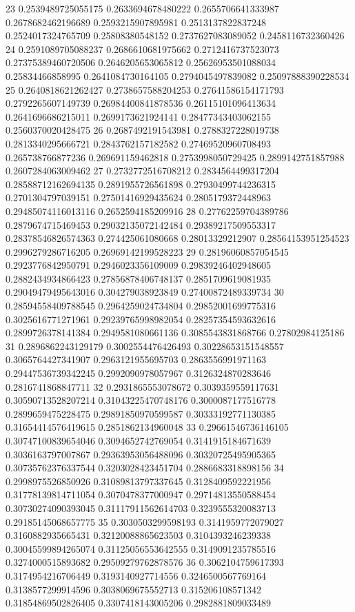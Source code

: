 23 0.2539489725055175 0.2633694678480222 0.2655706641333987 0.2678682462196689 0.2593215907895981 0.2513137822837248 0.2524017324765709 0.25808380548152 0.2737627083089052 0.2458116732360426
24 0.2591089705088237 0.2686610681975662 0.2712416737523073 0.27375389460720506 0.2646205653065812 0.25626953501088034 0.25834466858995 0.2641084730164105 0.2794045497839082 0.25097888390228534
25 0.2640818621262427 0.2738657588204253 0.27641586154171793 0.2792265607149739 0.26984400841878536 0.26115101096413634 0.2641696686215011 0.2699173621924141 0.28477343403062155 0.2560370020428475
26 0.2687492191543981 0.2788327228019738 0.2813340295666721 0.2843762157182582 0.27469520960708493 0.265738766877236 0.269691159462818 0.2753998050729425 0.2899142751857988 0.2607284063009462
27 0.2732772516708212 0.2834564499317204 0.28588712162694135 0.2891955726561898 0.27930499744236315 0.2701304797039151 0.27501416929435624 0.2805179372448963 0.29485074116013116 0.2652594185209916
28 0.27762259704389786 0.2879674715469453 0.29032135072142484 0.29389217509553317 0.28378546826574363 0.274425061080668 0.28013329212907 0.28564153951254523 0.2996279286716205 0.26969142199528223
29 0.28196060857054545 0.2923776842950791 0.2946023356109009 0.29839246402948605 0.2882434934866423 0.27856878406748137 0.2851709619081935 0.29049479495643016 0.304279038923849 0.27400872489339734
30 0.28594558409788545 0.2964259024734804 0.29852001699775316 0.3025616771271961 0.29239765998982054 0.28257354593632616 0.2899726378141384 0.2949581080661136 0.3085543831868766 0.27802984125186
31 0.2896862243129179 0.3002554476426493 0.30228653151548557 0.3065764427341907 0.2963121955695703 0.2863556991971163 0.29447536739342245 0.2992090978057967 0.3126324870283646 0.2816741868847711
32 0.2931865553078672 0.3039359559117631 0.30590713528207214 0.31043225470748176 0.3000087177516778 0.2899659475228475 0.29891850970599587 0.30333192771130385 0.31654414576419615 0.2851862134960048
33 0.29661546736146105 0.30747100839654046 0.3094652742769054 0.3141915184671639 0.3036163797007867 0.29363953056488096 0.30320725495905365 0.30735762376337544 0.3203028423451704 0.2886683318898156
34 0.2998975526850926 0.31089813797337645 0.3128409592221956 0.31778139814711054 0.3070478377000947 0.29714813550588454 0.30730274090393045 0.31117911562614703 0.3239555320083713 0.29185145068657775
35 0.3030503299598193 0.3141959772079027 0.3160882935665431 0.32120088865623503 0.3104393246239338 0.30045599894265074 0.31125056553642555 0.3149091235785516 0.3274000515893682 0.29509279762878576
36 0.3062104759617393 0.3174954216706449 0.3193140927714556 0.3246500567769164 0.3138577299914596 0.3038069675552713 0.315206108571342 0.31854869502826405 0.3307418143005206 0.2982881809033489
